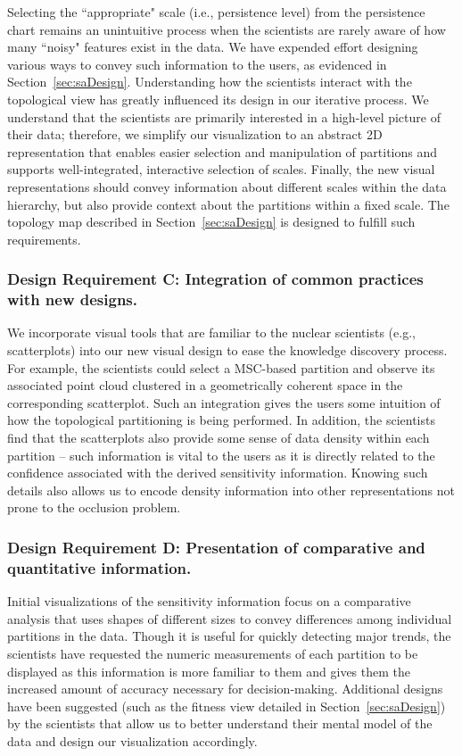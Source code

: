 Selecting the ``appropriate" scale (i.e., persistence level) from the persistence chart remains an unintuitive process when the scientists are rarely aware of how many ``noisy" features exist in the data. We have expended effort designing various ways to convey such information to the users, as evidenced in Section~\ref{sec:saDesign}.
%
Understanding how the scientists interact with the topological view has greatly influenced its design in our iterative process.
%
We understand that the scientists are primarily interested in a high-level picture of their data; therefore, we simplify our visualization to an abstract 2D representation that enables easier selection and manipulation of partitions and supports well-integrated, interactive selection of scales.
%
Finally, the new visual representations should convey information about different scales within the data hierarchy, but also provide context about the
partitions within a fixed scale.
%
The topology map described in Section~\ref{sec:saDesign} is designed to fulfill such requirements.

\subsubsection{Design Requirement C: Integration of common practices with new designs.}

We incorporate visual tools that are familiar to the nuclear scientists (e.g., scatterplots) into our new visual design to ease the knowledge discovery process.
%
For example, the scientists could select a MSC-based partition and observe its associated point cloud clustered in a geometrically coherent space in the corresponding scatterplot.
%
Such an integration gives the users some intuition of how the topological partitioning is being performed.
%
In addition, the scientists find that the scatterplots also provide some sense of data density within each partition -- such information is vital to the users as it is directly related to the confidence associated with the derived sensitivity information.
%
Knowing such details also allows us to encode density information into other representations not prone to the occlusion problem.

\subsubsection{Design Requirement D: Presentation of comparative and quantitative information.}

Initial visualizations of the sensitivity information focus on a comparative analysis that uses shapes of different sizes to convey differences among individual  partitions in the data.
%
Though it is useful for quickly detecting major trends, the scientists have requested the numeric measurements of each partition to be displayed as this information is more familiar to them and gives them the increased amount of accuracy necessary for decision-making.
%
Additional designs have been suggested (such as the fitness view detailed in Section~\ref{sec:saDesign}) by the scientists that allow us to better understand their mental model of the data and design our visualization accordingly.

